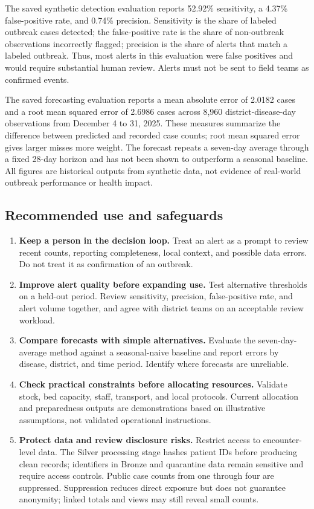 \documentclass[11pt,a4paper]{article}
\begin{document}
The saved synthetic detection evaluation reports 52.92\% sensitivity, a 4.37\% false-positive rate, and 0.74\% precision. Sensitivity is the share of labeled outbreak cases detected; the false-positive rate is the share of non-outbreak observations incorrectly flagged; precision is the share of alerts that match a labeled outbreak. Thus, most alerts in this evaluation were false positives and would require substantial human review. Alerts must not be sent to field teams as confirmed events.

The saved forecasting evaluation reports a mean absolute error of 2.0182 cases and a root mean squared error of 2.6986 cases across 8,960 district-disease-day observations from December 4 to 31, 2025. These measures summarize the difference between predicted and recorded case counts; root mean squared error gives larger misses more weight. The forecast repeats a seven-day average through a fixed 28-day horizon and has not been shown to outperform a seasonal baseline. All figures are historical outputs from synthetic data, not evidence of real-world outbreak performance or health impact.

\clearpage
\subsection*{Recommended use and safeguards}
\begin{enumerate}
    \item \textbf{Keep a person in the decision loop.} Treat an alert as a prompt to review recent counts, reporting completeness, local context, and possible data errors. Do not treat it as confirmation of an outbreak.
    \item \textbf{Improve alert quality before expanding use.} Test alternative thresholds on a held-out period. Review sensitivity, precision, false-positive rate, and alert volume together, and agree with district teams on an acceptable review workload.
    \item \textbf{Compare forecasts with simple alternatives.} Evaluate the seven-day-average method against a seasonal-naive baseline and report errors by disease, district, and time period. Identify where forecasts are unreliable.
    \item \textbf{Check practical constraints before allocating resources.} Validate stock, bed capacity, staff, transport, and local protocols. Current allocation and preparedness outputs are demonstrations based on illustrative assumptions, not validated operational instructions.
    \item \textbf{Protect data and review disclosure risks.} Restrict access to encounter-level data. The Silver processing stage hashes patient IDs before producing clean records; identifiers in Bronze and quarantine data remain sensitive and require access controls. Public case counts from one through four are suppressed. Suppression reduces direct exposure but does not guarantee anonymity; linked totals and views may still reveal small counts.
\end{enumerate}
\end{document}
